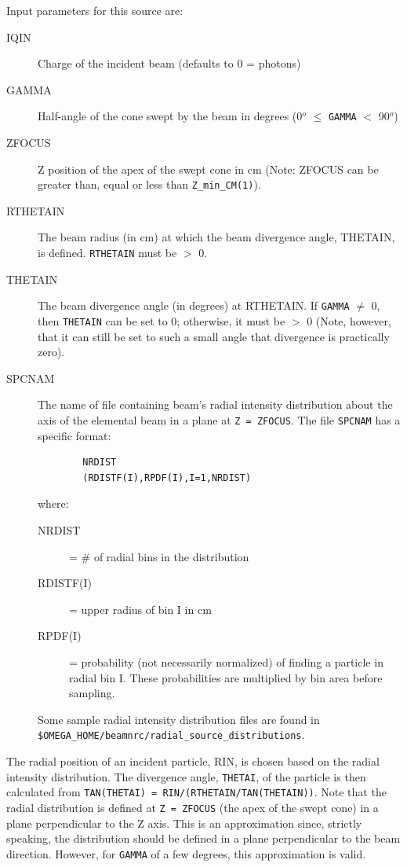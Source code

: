 \documentclass[12pt,twoside]{article}
\begin{document}
Input parameters for this source are:
\vspace{-3mm}
\begin{description}
\item [IQIN] Charge of the incident beam (defaults to 0 = photons)
\item [GAMMA] Half-angle of the cone swept by the beam in degrees (0$^o$ $\leq$
\verb+GAMMA+ $<$ 90$^o$)
\item [ZFOCUS] Z position of the apex of the swept cone in cm (Note: ZFOCUS can
be greater than, equal or less than {\tt Z\_min\_CM(1)}).
\item [RTHETAIN] The beam radius (in cm)
at which the beam divergence angle, THETAIN, is
defined. {\tt RTHETAIN} must be $>$ 0.
\item [THETAIN] The beam divergence angle (in degrees) at RTHETAIN.  If
{\tt GAMMA} $\neq$ 0, then {\tt THETAIN} can be set to 0; otherwise, it
must be $>$ 0 (Note, however, that it can still be set to such a small
angle that divergence is practically zero).
\item [SPCNAM] The name of file containing beam's radial intensity
distribution about the axis of the elemental beam in a plane at {\tt Z =
ZFOCUS}.
The file \verb+SPCNAM+ has a specific format:
\vspace{-5mm}
\begin{verbatim}
        NRDIST
        (RDISTF(I),RPDF(I),I=1,NRDIST)
\end{verbatim}
\vspace{-5mm}
where:
\begin{description}
\item [NRDIST] = \# of radial bins in the distribution
\item [RDISTF(I)] = upper radius of bin I in cm
\item [RPDF(I)] = probability (not necessarily normalized) of finding a
                  particle in radial bin I.  These probabilities are multiplied
                  by bin area before sampling.
\end{description}
Some sample radial intensity distribution files are found in\\
 {\tt \$OMEGA\_HOME/beamnrc/radial\_source\_distributions}.
\end{description}
The radial position of an incident particle, RIN, is chosen based on
the radial intensity distribution.  The divergence angle, {\tt THETAI}, of the
particle is then
calculated from {\tt TAN(THETAI) = RIN/(RTHETAIN/TAN(THETAIN))}.
Note that the radial distribution is defined at {\tt Z = ZFOCUS} (the apex of the swept
cone) in a plane perpendicular to the Z axis.  This is an approximation since,
strictly speaking, the distribution should be defined in a plane perpendicular
to the beam direction.  However, for {\tt GAMMA} of a
few degrees, this approximation is valid.
\end{document}
